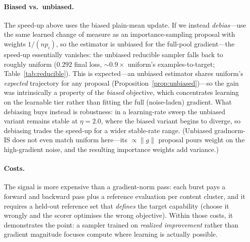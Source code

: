 \documentclass[11pt]{article}
\begin{document}
\paragraph{Biased vs.\ unbiased.} The speed-up above uses the biased plain-mean
update. If we instead \emph{debias}---use the same learned change of measure as an
importance-sampling proposal with weights $1/(n p_i)$, so the estimator is unbiased
for the full-pool gradient---the speed-up essentially vanishes: the unbiased
reducible sampler falls back to roughly uniform ($0.292$ final loss,
$\sim\!0.9\times$ uniform's examples-to-target; Table~\ref{tab:reducible}). This is
expected---an unbiased estimator shares uniform's \emph{expected} trajectory for
any proposal (Proposition~\ref{prop:unbiased})---so the gain was intrinsically a
property of the \emph{biased} objective, which concentrates learning on the
learnable tier rather than fitting the full (noise-laden) gradient. What debiasing
buys instead is robustness: in a learning-rate sweep the unbiased variant remains
stable at $\eta=2.0$, where the biased variant begins to diverge, so debiasing
trades the speed-up for a wider stable-rate range. (Unbiased gradnorm-IS does not
even match uniform here---its $\propto\|g\|$ proposal pours weight on the
high-gradient noise, and the resulting importance weights add variance.)

\paragraph{Costs.} The signal is more expensive than a gradient-norm pass: each
burst pays a forward and backward pass plus a reference evaluation per content
cluster, and it requires a held-out reference set that \emph{defines} the target
capability (choose it wrongly and the scorer optimises the wrong objective).
Within those costs, it demonstrates the point: a sampler trained on \emph{realized
improvement} rather than gradient magnitude focuses compute where learning is
actually possible.
\end{document}
